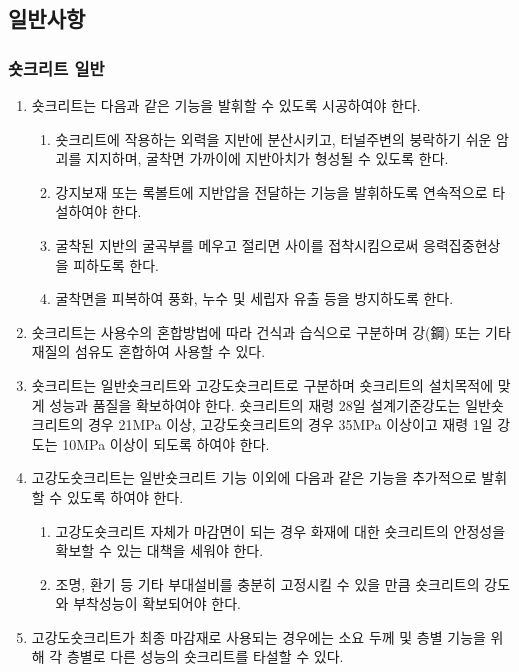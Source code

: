 \subsection{일반사항}

\subsubsection{숏크리트 일반}

\begin{enumerate}
\item 숏크리트는 다음과 같은 기능을 발휘할 수 있도록 시공하여야 한다.
	\begin{enumerate}
	\item 숏크리트에 작용하는 외력을 지반에 분산시키고, 터널주변의 붕락하기 쉬운 암괴를 지지하며, 굴착면 가까이에 지반아치가 형성될 수 있도록 한다. 
	\item 강지보재 또는 록볼트에 지반압을 전달하는 기능을 발휘하도록 연속적으로 타설하여야 한다.
	\item 굴착된 지반의 굴곡부를 메우고 절리면 사이를 접착시킴으로써 응력집중현상을 피하도록 한다.
	\item 굴착면을 피복하여 풍화, 누수 및 세립자 유출 등을 방지하도록 한다.
	\end{enumerate}
\item 숏크리트는 사용수의 혼합방법에 따라 건식과 습식으로 구분하며 강(鋼) 또는 기타 재질의 섬유도 혼합하여 사용할 수 있다.
\item 숏크리트는 일반숏크리트와 고강도숏크리트로 구분하며 숏크리트의 설치목적에 맞게 성능과 품질을 확보하여야 한다. 
      숏크리트의 재령 28일 설계기준강도는 일반숏크리트의 경우 21MPa 이상, 고강도숏크리트의 경우 35MPa 이상이고 
      재령 1일 강도는 10MPa 이상이 되도록 하여야 한다.
\item 고강도숏크리트는 일반숏크리트 기능 이외에 다음과 같은 기능을 추가적으로 발휘할 수 있도록 하여야 한다.   
	\begin{enumerate}
	\item 고강도숏크리트 자체가 마감면이 되는 경우 화재에 대한 숏크리트의 안정성을 확보할 수 있는 대책을 세워야 한다.  
	\item 조명, 환기 등 기타 부대설비를 충분히 고정시킬 수 있을 만큼 숏크리트의 강도와 부착성능이 확보되어야 한다.
	\end{enumerate}
\item 고강도숏크리트가 최종 마감재로 사용되는 경우에는 소요 두께 및 층별 기능을 위해 각 층별로 다른 성능의 숏크리트를 타설할 수 있다.
\end{enumerate}

